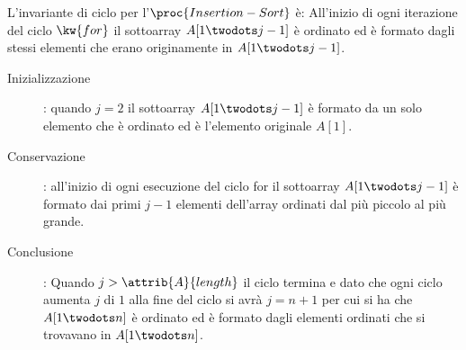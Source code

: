 L'invariante di ciclo per l'$\proc{Insertion-Sort}$ è:
All'inizio di ogni iterazione del ciclo $\kw{for}$ il sottoarray $A[1 \twodots j-1]$
è ordinato ed è formato dagli stessi elementi che erano originamente in $A[1\twodots j-1]$.
\begin{description}
  \item[Inizializzazione]: quando $j = 2$ il sottoarray $A[1\twodots j-1]$ è formato
                           da un solo elemento che è ordinato ed è l'elemento originale $A[1]$.
  \item[Conservazione]: all'inizio di ogni esecuzione del ciclo for il sottoarray $A[1 \twodots j-1]$
                        è formato dai primi $j-1$ elementi dell'array ordinati dal
                        più piccolo al più grande.

  \item[Conclusione]: Quando $j > \attrib{A}{length}$ il ciclo termina e dato che ogni
                      ciclo aumenta $j$ di $1$ alla fine del ciclo si avrà $j = n + 1$
                      per cui si ha che $A[1\twodots n]$ è ordinato ed è formato
                      dagli elementi ordinati che si trovavano in $A[1 \twodots n]$.
\end{description}

